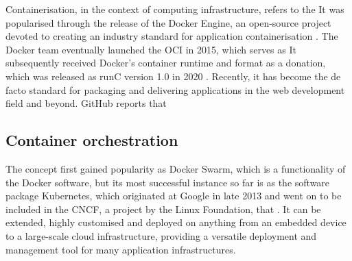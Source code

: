 Containerisation, in the context of computing infrastructure, refers to the  It was popularised through the release of the Docker Engine, an open-source project devoted to creating an industry standard for application containerisation \parencite{dockerRelease}. The Docker team eventually launched the \ac{OCI} in 2015, which serves as  It subsequently received Docker's container runtime and format as a donation, which was released as runC version 1.0 in 2020 \parencite{openContainerInitiative}. Recently, it has become the de facto standard for packaging and delivering applications in the web development field and beyond. GitHub reports that 

\subsection{Container orchestration}

 The concept first gained popularity as Docker Swarm, which is a functionality of the Docker software, but its most successful instance so far is as the software package Kubernetes, which originated at Google in late 2013 \parencite{kubernetesHistory} and went on to be included in the \ac{CNCF}, a project by the Linux Foundation, that . It can be extended, highly customised and deployed on anything from an embedded device to a large-scale cloud infrastructure, providing a versatile deployment and management tool for many application infrastructures.
